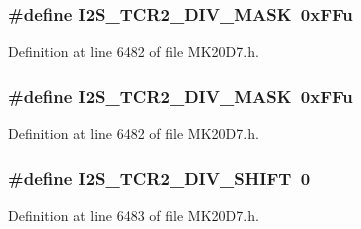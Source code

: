 \subsubsection[{\texorpdfstring{I2\+S\+\_\+\+T\+C\+R2\+\_\+\+D\+I\+V\+\_\+\+M\+A\+SK}{I2S_TCR2_DIV_MASK}}]{\setlength{\rightskip}{0pt plus 5cm}\#define I2\+S\+\_\+\+T\+C\+R2\+\_\+\+D\+I\+V\+\_\+\+M\+A\+SK~0x\+F\+Fu}\hypertarget{group___i2_s___register___masks_ga9bbd597b1d3a839f74d15c3b6c309bb7}{}\label{group___i2_s___register___masks_ga9bbd597b1d3a839f74d15c3b6c309bb7}


Definition at line 6482 of file M\+K20\+D7.\+h.

\subsubsection[{\texorpdfstring{I2\+S\+\_\+\+T\+C\+R2\+\_\+\+D\+I\+V\+\_\+\+M\+A\+SK}{I2S_TCR2_DIV_MASK}}]{\setlength{\rightskip}{0pt plus 5cm}\#define I2\+S\+\_\+\+T\+C\+R2\+\_\+\+D\+I\+V\+\_\+\+M\+A\+SK~0x\+F\+Fu}\hypertarget{group___i2_s___register___masks_ga9bbd597b1d3a839f74d15c3b6c309bb7}{}\label{group___i2_s___register___masks_ga9bbd597b1d3a839f74d15c3b6c309bb7}


Definition at line 6482 of file M\+K20\+D7.\+h.

\subsubsection[{\texorpdfstring{I2\+S\+\_\+\+T\+C\+R2\+\_\+\+D\+I\+V\+\_\+\+S\+H\+I\+FT}{I2S_TCR2_DIV_SHIFT}}]{\setlength{\rightskip}{0pt plus 5cm}\#define I2\+S\+\_\+\+T\+C\+R2\+\_\+\+D\+I\+V\+\_\+\+S\+H\+I\+FT~0}\hypertarget{group___i2_s___register___masks_gad553f8b1c1cc03ded483d997640b410a}{}\label{group___i2_s___register___masks_gad553f8b1c1cc03ded483d997640b410a}


Definition at line 6483 of file M\+K20\+D7.\+h.

